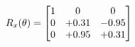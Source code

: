 \documentclass[preview]{standalone}
\begin{document}
\begin{align*}
\special{dvisvgm:raw <g id='unique000'>}R_{x}(\theta) = \begin{bmatrix}1 & 0 & 0 \\0 & +0.31 & -0.95 \\0 & +0.95 & +0.31\end{bmatrix}\special{dvisvgm:raw </g>}
\end{align*}
\end{document}
